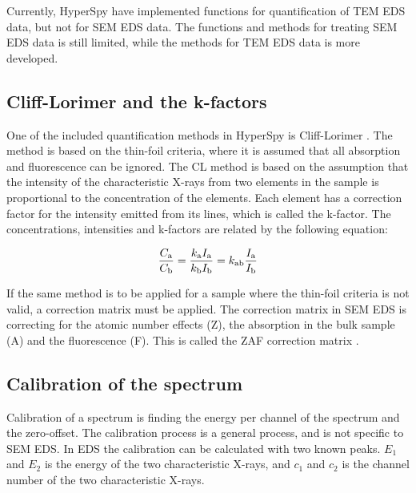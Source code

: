 Currently, HyperSpy have implemented functions for quantification of TEM EDS data, but not for SEM EDS data.
The functions and methods for treating SEM EDS data is still limited, while the methods for TEM EDS data is more developed.








%
% 
\subsection{Cliff-Lorimer and the k-factors}
\label{sec:theory:empirical:kfactors}

One of the included quantification methods in HyperSpy is Cliff-Lorimer \cite{CL1975}.
The method is based on the thin-foil criteria, where it is assumed that all absorption and fluorescence can be ignored.
The CL method is based on the assumption that the intensity of the characteristic X-rays from two elements in the sample is proportional to the concentration of the elements.
Each element has a correction factor for the intensity emitted from its lines, which is called the k-factor.
The concentrations, intensities and k-factors are related by the following equation:

\begin{equation}
    \frac{C_\textnormal{a}}{C_\textnormal{b}} = \frac{k_\textnormal{a} I_\textnormal{a}}{k_\textnormal{b} I_\textnormal{b}} = k_\textnormal{ab}  \frac{I_\textnormal{a}}{I_\textnormal{b}}
\end{equation}

If the same method is to be applied for a sample where the thin-foil criteria is not valid, a correction matrix must be applied.
The correction matrix in SEM EDS is correcting for the atomic number effects (Z), the absorption in the bulk sample (A) and the fluorescence (F).
This is called the ZAF correction matrix \cite{ZAF_1978} \cite[Sec. 19.10]{goldstein_scanning_2018}.

%
\subsection{Calibration of the spectrum}
\label{sec:theory:calibration}


Calibration of a spectrum is finding the energy per channel of the spectrum and the zero-offset.
The calibration process is a general process, and is not specific to SEM EDS.
In EDS the calibration can be calculated with two known peaks.
$E_1$ and $E_2$ is the energy of the two characteristic X-rays, and $c_1$ and $c_2$ is the channel number of the two characteristic X-rays.

